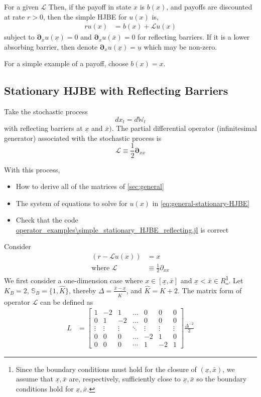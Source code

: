 \documentclass[11pt]{article}
\newcommand{\D}[1][]{\ensuremath{\boldsymbol{\partial}_{#1}}}
\newcommand{\W}{\ensuremath{\mathbb{W}}}
\begin{document}
For a given $\mathcal{L}$ Then, if the payoff in state $x$ is $b(x)$, and payoffs are discounted at rate $r > 0$, then the simple HJBE for $u(x)$ is,
\begin{align}
r u(x) &= b(x) + \mathcal{L} u(x)\label{eq:general-stationary-HJBE}
\end{align}
subject to $\D[x]u(\underline{x}) = 0$ and $\D[x]u(\bar{x}) = 0$ for reflecting barriers.  If it is a lower absorbing barrier, then denote $\D[x]u(\underline{x}) = \underline{u}$ which may be non-zero.

For a simple example of a payoff, choose $b(x) = x$.

\subsection{Stationary HJBE with Reflecting Barriers}
Take the stochastic process
$$
d x_t = d \W_t
$$
with reflecting barriers at $\underline{x}$ and $\bar{x})$.  The partial differential operator (infinitesimal generator) associated with the stochastic process is
$$
	\mathcal{L} \equiv \frac{1}{2}\D[xx]
$$

With this process,
\begin{itemize}
	\item How to derive all of the matrices of \cref{sec:general}
	\item The system of equations to solve for $u(x)$ in \cref{eq:general-stationary-HJBE}
	\item Check that the code \url{operator_examples\simple_stationary_HJBE_reflecting.jl} is correct
\end{itemize}
Consider
\begin{align}
(r- \mathcal{L} u(x)) &= x\label{HJBE_reflecting_barriers_PDE}\\
\text{where }\mathcal{L}&\equiv \frac{1}{2}\partial_{xx}
\end{align}
We first consider a one-dimension case where $x\in [\underline{\textit{\~{x}}}, \bar{\textit{\~{x}}}]$ and $\underline{\textit{\~{x}}} < \bar{\textit{\~{x}}} \in R$\footnote{Since the boundary conditions must hold for the closure of $(\underline{x},\bar{x})$, we assume that $\underline{\textit{\~{x}}}, \bar{\textit{\~{x}}}$ are, respectively, sufficiently close to $\underline{x}, \bar{x}$ so the boundary conditions hold for $\underline{\textit{\~{x}}}, \bar{\textit{\~{x}}}$.}. Let $K_B = 2$, $\mathbb{S}_B = \{1,\hat{K}\}$, thereby $\Delta  = \frac{\bar{\textit{\~{x}}}-\underline{\textit{\~{x}}}}{\hat{K}}$, and $\hat{K} = K+2$. The matrix form of operator $\mathcal{L}$ can be defined as
\begin{align}
L &= \begin{bmatrix}
1&-2&1&\dots&0&0&0\\
0&1&-2&\dots&0&0&0\\
\vdots&\vdots&\vdots&\ddots&\vdots&\vdots&\vdots\\
0&0&0&\dots&-2&1&0\\
0&0&0&\cdots&1&-2&1
\end{bmatrix}\frac{\Delta^{-2}}{2}\nonumber
\end{align}
\end{document}
